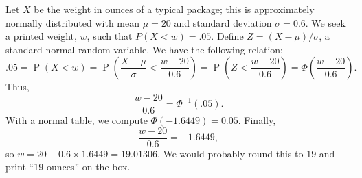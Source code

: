 \documentclass[11pt]{exam}
\DeclareMathOperator*{\Prob}{P}
\renewcommand{\Pr}{\Prob}
\begin{document}
\begin{questions}
\begin{solution}
Let $X$ be the weight in ounces of a typical package; this is approximately
normally distributed with mean $\mu = 20$ and standard deviation $\sigma =
0.6$.  We seek a printed weight, $w$, such that $P(X < w) = .05$.  Define
$Z = (X - \mu)/\sigma$, a standard normal random variable.  We have
the following relation:
\[
  .05
  = \Pr(X < w) 
  = \Pr\left(\frac{X - \mu}{\sigma} < \frac{w - 20}{0.6}\right)
  = \Pr\left(Z < \frac{w - 20}{0.6}\right)
  = \Phi\left(\frac{w - 20}{0.6}\right).
\]
Thus,
\[
  \frac{w - 20}{0.6} = \Phi^{-1}(.05).
\]
With a normal table, we compute $\Phi(-1.6449) = 0.05$.
Finally,
\[
  \frac{w - 20}{0.6} = -1.6449,
\]
so $w = 20 - 0.6 \times 1.6449 = 19.01306$.  We would probably round this to
$19$ and print ``19 ounces'' on the box.
\end{solution}



\end{questions}
\end{document}
